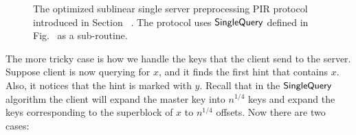 \begin{figure}[p]
\begin{minipage}{\textwidth}
\begin{mdframed}
\begin{enumerate}[leftmargin=5mm,itemsep=1pt]
            \end{enumerate}
        \end{mdframed}
    \end{minipage}
    \caption{The optimized sublinear single server preprocessing PIR protocol
    introduced in Section ~. The protocol uses
    $\mathsf{SingleQuery}$ defined in Fig.~ as a
    sub-routine.}
    \label{fig:optimized:single-server}
\end{figure}


The more tricky case is how we handle the keys that the client send to the
server. Suppose client is now querying for $x$, and it finds the first hint that
contains $x$. Also, it notices that the hint is marked with $y$. Recall that in
the $\mathsf{SingleQuery}$ algorithm the client will expand the master key into
$n^{1/4}$ keys and expand the keys corresponding to the superblock of $x$ to
$n^{1/4}$ offsets. Now there are two cases:

